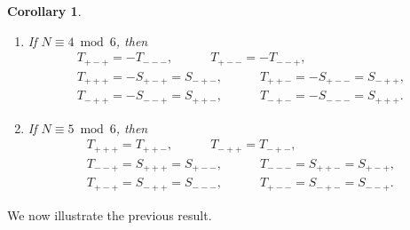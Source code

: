 \documentclass[11pt,reqno]{amsart}
\newtheorem{corollary}[theorem]{Corollary}
\theoremstyle{definition}
\numberwithin{equation}{section}
\renewcommand{\=}{\;=\;}
\def\qqquad{\qquad\quad}
\begin{document}
\begin{corollary}
\begin{enumerate}
\begin{gather*}
    =e^{-\frac{2\pi i M}{3}}S_{---},\\
  T_{++-}
    =e^{\frac{2\pi i M}{3}}T_{+-+}
    =e^{-\frac{2\pi i M}{3}}S_{-+-}
    =e^{-\frac{2\pi i M}{3}}S_{--+},\\
  T_{-++}
    =e^{\frac{2\pi i M}{3}}T_{---}
    =e^{-\frac{2\pi i M}{3}}S_{+++}
    =e^{-\frac{2\pi i M}{3}}S_{+--},\\
  T_{-+-}
    =e^{\frac{2\pi i M}{3}}T_{--+}
    =e^{-\frac{2\pi i M}{3}} - S_{++-}
    =e^{-\frac{2\pi i M}{3}} - S_{+-+}.
  \end{gather*}
  \item If $N\equiv 4 \bmod 6$, then
   \begin{gather*}
   T_{+-+} = -T_{---},\qqquad
   T_{+--} = -T_{--+},\\
   T_{+++} = -S_{+-+}=S_{-+-},\qqquad
   T_{++-} = -S_{+--}=S_{-++},\\
   T_{-++} = -S_{--+}=S_{++-},\qqquad
   T_{-+-} = -S_{---}=S_{+++}.
  \end{gather*}
  \item If $N\equiv 5 \bmod 6$, then 
  \begin{gather*}
   T_{+++} = T_{++-},\qqquad
   T_{-++} = T_{-+-},\\
   T_{--+} = S_{+++}=S_{+--},\qqquad
   T_{---} = S_{++-}=S_{+-+},\\
   T_{+-+} = S_{-++}=S_{---},\qqquad
   T_{+--} = S_{-+-}=S_{--+}.
\end{gather*}
 \end{enumerate}
\end{corollary}

We now illustrate the previous result.
\end{document}
